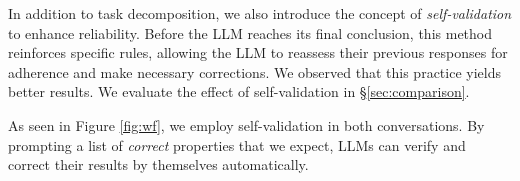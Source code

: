 In addition to task decomposition,  we also introduce the concept of \textit{self-validation} to enhance reliability.
Before the LLM reaches its final conclusion,
this method reinforces specific rules, allowing the LLM to reassess their previous responses for adherence and make necessary corrections. We observed that this practice yields better results. We evaluate the effect of self-validation in \S\ref{sec:comparison}.

As seen in Figure \ref{fig:wf}, we employ self-validation in both conversations. 
By prompting a list of  \textit{correct} properties that we expect, LLMs can verify and correct their results by themselves automatically.


